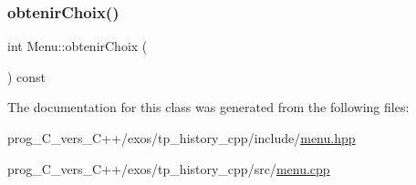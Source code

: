 \subsubsection{\texorpdfstring{obtenir\+Choix()}{obtenirChoix()}\hspace{0.1cm}{\footnotesize\ttfamily [2/2]}}
{\footnotesize\ttfamily int Menu\+::obtenir\+Choix (\begin{DoxyParamCaption}{ }\end{DoxyParamCaption}) const}



The documentation for this class was generated from the following files\+:\begin{DoxyCompactItemize}
\item 
prog\+\_\+\+C\+\_\+vers\+\_\+\+C++/exos/tp\+\_\+history\+\_\+cpp/include/\hyperlink{include_2menu_8hpp}{menu.\+hpp}\item 
prog\+\_\+\+C\+\_\+vers\+\_\+\+C++/exos/tp\+\_\+history\+\_\+cpp/src/\hyperlink{src_2menu_8cpp}{menu.\+cpp}\end{DoxyCompactItemize}
